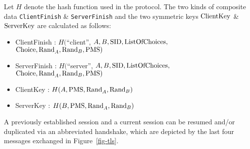 \documentclass[a4paper,fleqn]{cas-dc}
\begin{document}
Let $H$ denote the hash function used in the protocol.
The two kinds of composite data \verb!ClientFinish! \& \verb!ServerFinish! and the two symmetric keys $\rm ClientKey$ \& $\rm ServerKey$ are calculated as follows:

\begin{itemize}
\item 
ClientFinish : $H($``client'', $A, B, \rm SID, ListOfChoices,$
	${\rm Choice, Rand}_A, {\rm Rand}_B, {\rm PMS})$

\item
ServerFinish : $H($``server'', $A, B, \rm SID, ListOfChoices,$ 
	${\rm Choice, Rand}_A, {\rm Rand}_B, {\rm PMS})$

\item
ClientKey : $H(A, {\rm PMS, Rand}_A, {\rm Rand}_B)$
 
\item
ServerKey : $H(B, {\rm PMS, Rand}_A, {\rm Rand}_B)$
 
\end{itemize}

A previously established session and a current session
can be resumed and/or duplicated via an abbreviated handshake, which are depicted by the last four messages exchanged in Figure~\ref{fig-tls}.


%
\end{document}
